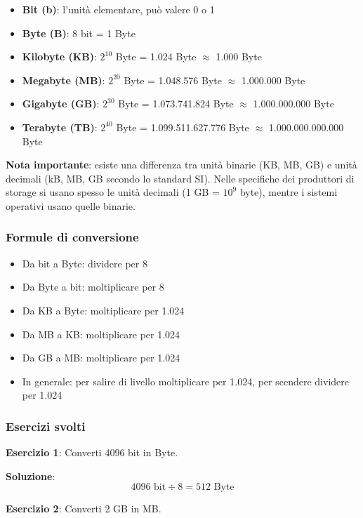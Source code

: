 \documentclass[12pt,a4paper]{article}
\begin{document}
\begin{itemize}
    \item \textbf{Bit (b)}: l'unità elementare, può valere 0 o 1
    \item \textbf{Byte (B)}: 8 bit = 1 Byte
    \item \textbf{Kilobyte (KB)}: $2^{10}$ Byte = 1.024 Byte $\approx$ 1.000 Byte
    \item \textbf{Megabyte (MB)}: $2^{20}$ Byte = 1.048.576 Byte $\approx$ 1.000.000 Byte
    \item \textbf{Gigabyte (GB)}: $2^{30}$ Byte = 1.073.741.824 Byte $\approx$ 1.000.000.000 Byte
    \item \textbf{Terabyte (TB)}: $2^{40}$ Byte = 1.099.511.627.776 Byte $\approx$ 1.000.000.000.000 Byte
\end{itemize}

\textbf{Nota importante}: esiste una differenza tra unità binarie (KB, MB, GB) e unità decimali (kB, MB, GB secondo lo standard SI). Nelle specifiche dei produttori di storage si usano spesso le unità decimali (1 GB = $10^9$ byte), mentre i sistemi operativi usano quelle binarie.

\subsubsection{Formule di conversione}
\begin{itemize}
    \item Da bit a Byte: dividere per 8
    \item Da Byte a bit: moltiplicare per 8
    \item Da KB a Byte: moltiplicare per 1.024
    \item Da MB a KB: moltiplicare per 1.024
    \item Da GB a MB: moltiplicare per 1.024
    \item In generale: per salire di livello moltiplicare per 1.024, per scendere dividere per 1.024
\end{itemize}

\subsubsection{Esercizi svolti}

\textbf{Esercizio 1}: Converti 4096 bit in Byte.

\textbf{Soluzione}:
\[
4096 \text{ bit} \div 8 = 512 \text{ Byte}
\]

\textbf{Esercizio 2}: Converti 2 GB in MB.
\end{document}
